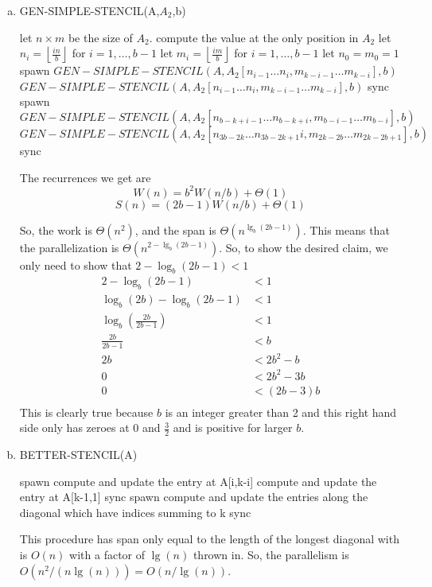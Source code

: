\documentclass{article}
\begin{document}
\begin{enumerate}[a.]
\item
\begin{algorithm}
\caption{GEN-SIMPLE-STENCIL(A,$A_2$,b)}
\begin{algorithmic}
\State let $n\times m$ be the size of $A_2$.
\State compute the value at the only position in $A_2$
\Else
\State let $n_i = \left\lfloor \frac{in}{b}\right\rfloor$ for $i=1,\ldots, b-1$ 
\State let $m_i = \left\lfloor \frac{im}{b}\right\rfloor$ for $i=1,\ldots, b-1$
\State let $n_0 = m_0 = 1$
\State spawn $GEN-SIMPLE-STENCIL(A,A_2[n_{i-1}\ldots n_i,m_{k-i-1}\ldots m_{k-i}],b)$
\EndFor
\State $GEN-SIMPLE-STENCIL(A,A_2[n_{i-1}\ldots n_i,m_{k-i-1}\ldots m_{k-i}],b)$
\State sync
\EndFor
{}
\State spawn $GEN-SIMPLE-STENCIL(A,A_2[n_{b-k+i-1}\ldots n_{b-k+i},m_{b-i-1}\ldots m_{b-i}],b)$
\EndFor
\State $GEN-SIMPLE-STENCIL(A,A_2[n_{3b-2k}\ldots n_{3b-2k+1}i,m_{2k-2b}\ldots m_{2k-2b+1}],b)$
\State sync
\EndFor
\EndIf
\EndIf
\end{algorithmic}
\end{algorithm}

The recurrences we get are
\[
W(n) = b^2 W(n/b) + \Theta(1)
\]
\[
S(n) = (2b-1)W(n/b)+\Theta(1)
\]

So, the work is $\Theta(n^2)$, and the span is $\Theta(n^{\lg_b(2b-1)})$. This means that the parallelization is $\Theta(n^{2- \lg_b(2b-1)})$. So, to show the desired claim, we only need to show that $2-\log_b(2b-1)<1$
\begin{align*}
2-\log_b(2b-1)&<1\\
\log_b(2b)-\log_b(2b-1)&<1\\
\log_b\left(\frac{2b}{2b-1}\right)&<1\\
\frac{2b}{2b-1}&<b\\
2b&<2b^2 -b\\
0&<2b^2 -3b\\
0&<(2b -3)b\\
\end{align*}
This is clearly true because $b$ is an integer greater than 2 and this right hand side only has zeroes at 0 and $\frac{3}{2}$ and is positive for larger $b$.

\item
\begin{algorithm}
\caption{BETTER-STENCIL(A)}
\begin{algorithmic}
\State spawn compute and update the entry at A[i,k-i]
\EndFor
\State compute and update the entry at A[k-1,1]
\State sync
\EndFor
{}
\State spawn compute and update the entries along the diagonal which have indices summing to k
\EndFor
\State sync
\EndFor
\end{algorithmic}
\end{algorithm}

This procedure has span only equal to the length of the longest diagonal with is $O(n)$ with a factor of $\lg(n)$ thrown in. So, the parallelism is $O(n^2/(n\lg(n))) = O(n/\lg(n))$.
\end{enumerate}
\end{document}

